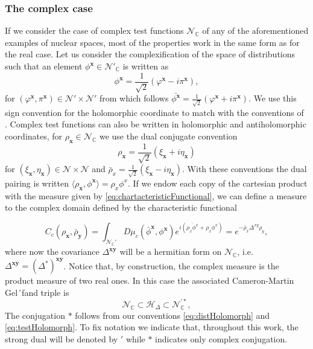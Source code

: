 \documentclass{elsarticle}%
\begin{document}
\subsubsection{The complex case}
If we consider the case of complex test functions $\mathcal{N}_\mathbb{C}$ of any of the aforementioned examples of nuclear spaces, most of the properties work in the same form as for the real case.  Let us consider the complexification of the space of distributions such that  an element $\phi^{\mathbf{x}}\in\mathcal{N}'_\mathbb{C}$ is written as \begin{equation}
    \label{eq:distHolomorph}
\phi^{\mathbf{x}}=\frac{1}{\sqrt{2}}(\varphi^{\mathbf{x}}-i\pi^{\mathbf{x}}),
\end{equation}  for $(\varphi^{\mathbf{x}},\pi^\mathbf{x})\in \mathcal{N}'\times \mathcal{N}'$ from which follows $\bar{\phi^{\mathbf{x}}}=\frac{1}{\sqrt{2}}(\varphi^{\mathbf{x}}+i\pi^{\mathbf{x}})$. We use this sign convention for the holomorphic coordinate to match with the conventions of \cite{alonsoGeometricFlavours2024}.   Complex test functions can also be written in holomorphic and antiholomorphic  coordinates, for $\rho_{\mathbf{x}}\in\mathcal{N}_\mathbb{C}$ we use the dual conjugate convention \begin{equation}
    \label{eq:testHolomorph}
\rho_\mathbf{x}=\frac{1}{\sqrt{2}}(\xi_\mathbf{x}+i\eta_\mathbf{x})
\end{equation} for $(\xi_{\mathbf{x}},\eta_{\mathbf{x}})\in \mathcal{N}\times\mathcal{N}$ and $\bar\rho_x=\frac{1}{\sqrt{2}}(\xi_\mathbf{x}-i\eta_\mathbf{x})$. With these conventions the dual pairing is written $\langle \rho_{\mathbf{x}},\phi^{\mathbf{x}}\rangle= \rho_x\phi^x$. If we endow each copy of the cartesian product with the measure given by \eqref{eq:chartacteristicFunctional},  we can define a measure to the complex domain  defined by the characteristic functional  

\begin{equation}
\label{eq:complexCharacteristicFunctional}
C_c(\rho_{\mathbf{x}},\bar\rho_{\mathbf{y}})=\int_{\mathcal{N}_{\mathbb{C}}'}D\mu_c(\bar \phi^{\mathbf{x}}, \phi^{\mathbf{x}}) e^{i({\overline{\rho_x{\phi}^x}+\rho_x{\phi}^x})} =e^{-\bar{\rho}_x\Delta^{xy}\rho_y},
\end{equation}
where now the covariance $\Delta^{\mathbf{xy}}$ will be a hermitian form on $\mathcal{N}_\mathbb{C}$, i.e. $\Delta^{\mathbf{xy}}=(\Delta^*)^{\mathbf{xy}}$. 
Notice that, by construction, the complex measure is the product measure of two real ones. In this case the associated Cameron-Martin Gel´fand triple is 
$$
\mathcal{N}_{\mathbb{C}}\subset \mathcal{H}_\Delta \subset \mathcal{N}^{\prime *}_\mathbb{C},
$$
The conjugation $*$ follows from our conventions \eqref{eq:distHolomorph} and \eqref{eq:testHolomorph}. To fix notation we indicate that, throughout  this work, the strong dual will be denoted  by $'$ while $*$ indicates only  complex conjugation. 
 
\end{document}
